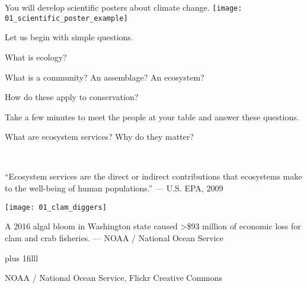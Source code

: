 \documentclass[t]{beamer}
\begin{document}
{
\begin{frame}
\end{frame}
}


\begin{frame}{You will develop scientific posters about climate change.}
	\vspace{-0.5\baselineskip}
		\texttt{[image: 01\_scientific\_poster\_example]}
\end{frame}

{
\begin{frame}
\end{frame}
}

\begin{frame}[t]{Let us begin with simple questions.}

	\hangpara What is ecology?
	
	\hangpara What is a community? An assemblage? An ecosystem?

	\hangpara How do these apply to conservation?

	\hangpara Take a few minutes to meet the people at your table and answer these questions.

\end{frame}

{
\begin{frame}[b]{What are ecosystem services? Why do they matter?}
	
\tiny\hfill\textcolor{white}{Gulf Restoration Network / Southwings, Flickr Creative Commons.}

\end{frame}
}


\begin{frame}[t]
	
	“Ecosystem services are the direct or indirect contributions that ecosystems make to the well-being of human populations.” — U.S. EPA, 2009 \vspace*{\baselineskip}
	
	\texttt{[image: 01\_clam\_diggers]}
	
	A 2016 algal bloom in Washington state caused \textgreater \$93 million of economic loss for clam and crab fisheries. --- NOAA / National Ocean Service
	
	\vskip0pt plus 1filll
	
	\hfill\tiny NOAA / National Ocean Service, Flickr Creative Commons
	
\end{frame}
\end{document}
